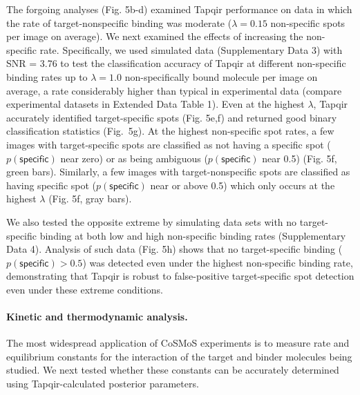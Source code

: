 The forgoing analyses (Fig. 5b-d) examined Tapqir performance on data in which the rate of target-nonspecific binding was moderate ($\lambda  = 0.15$ non-specific spots per image on average).  We next examined the effects of increasing the non-specific rate.  Specifically, we used  simulated data (Supplementary Data 3) with SNR = 3.76 to test the classification accuracy of Tapqir at different non-specific binding rates up to $\lambda  = 1.0$ non-specifically bound molecule per image on average, a rate considerably higher than typical in experimental data (compare experimental datasets in Extended Data Table 1).  Even at the highest $\lambda$,  Tapqir accurately identified target-specific spots (Fig. 5e,f) and returned good binary classification statistics (Fig.~5g).  At the highest non-specific spot rates, a few images with target-specific spots are classified as not having a specific spot ($p(\mathsf{specific})$ near zero) or as being ambiguous ($p(\mathsf{specific})$ near 0.5) (Fig. 5f, green bars). Similarly, a few images with target-nonspecific spots are classified as having specific spot ($p(\mathsf{specific})$ near or above 0.5) which only occurs at the highest $\lambda$ (Fig. 5f, gray bars).

We also tested the opposite extreme by simulating data sets with no target-specific binding at both low and high non-specific binding rates (Supplementary Data 4). Analysis of such data  (Fig. 5h) shows that no target-specific binding ($p(\mathsf{specific}) > 0.5$) was detected even under the highest non-specific binding rate, demonstrating that Tapqir is robust to false-positive target-specific spot detection even under these extreme conditions. 

\paragraph{Kinetic and thermodynamic analysis.}
The most widespread application of CoSMoS experiments is to measure rate and equilibrium constants for the interaction of the target and binder molecules being studied.  We next tested whether these constants can be accurately determined using Tapqir-calculated posterior parameters. 

